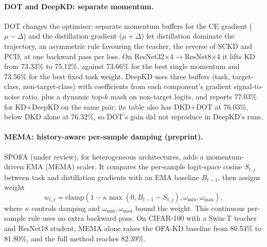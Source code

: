 \paragraph{DOT and DeepKD: separate momentum.}
DOT \citep{zhao2023dot} changes the optimiser: separate momentum buffers for the CE gradient
($\mu-\Delta$) and the distillation gradient ($\mu+\Delta$) let distillation dominate the
trajectory, an asymmetric rule favouring the teacher, the reverse of SCKD and PCD, at one backward
pass per loss. On ResNet32$\times$4$\to$ResNet8$\times$4 it lifts KD from 73.33\% to 75.12\%, against
73.66\% for the best single momentum and 73.56\% for the best fixed task weight. DeepKD
\citep{huang2025deepkd} uses three buffers (task, target-class, non-target-class) with coefficients
from each component's gradient signal-to-noise ratio, plus a dynamic top-$k$ mask on non-target
logits, and reports 77.03\% for KD+DeepKD on the same pair; its table also has DKD+DOT at 76.03\%,
below DKD alone at 76.32\%, so DOT's gain did not reproduce in DeepKD's runs.

\paragraph{MEMA: history-aware per-sample damping (preprint).}
SPOFA \citep{yang2026spofa} (under review), for heterogeneous architectures, adds a momentum-driven
EMA (MEMA) scaler. It compares the per-sample logit-space cosine $S_{t,j}$ between task and
distillation gradients with an EMA baseline $B_{t-1}$, then assigns weight
\[
w_{t,j}=\mathrm{clamp}(1-\kappa\max(0,B_{t-1}-S_{t,j}),\omega_{\min},\omega_{\max}),
\]
where $\kappa$ controls damping and $\omega_{\min},\omega_{\max}$ bound the weight. This continuous per-sample rule uses no extra backward pass. On CIFAR-100 with a Swin-T teacher and
ResNet18 student, MEMA alone raises the OFA-KD \citep{hao2023ofakd} baseline from 80.54\% to 81.80\%, and the full method
reaches 82.39\%.

